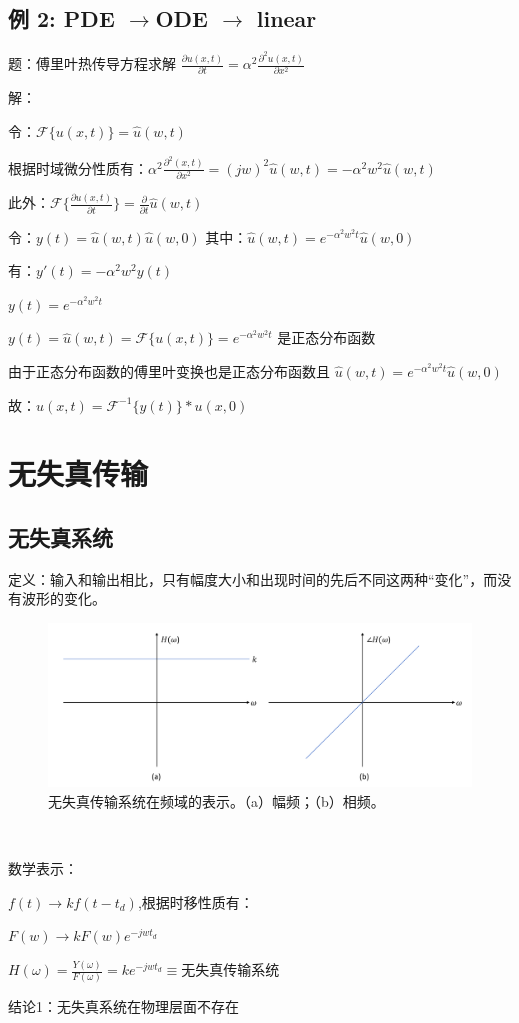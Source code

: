 \documentclass[UTF8]{ctexart}
\begin{document}
\subsection{例 2: PDE $\rightarrow $ODE $\rightarrow $ linear}
题：傅里叶热传导方程求解  $\frac{\partial u(x,t)}{\partial t}=\alpha ^2\frac{\partial^2 u(x,t)}{\partial x^2} $ \par
解：\par
\qquad 令：$\mathscr{F}\{u(x,t)\}=\hat{u}(w,t) $\par
\qquad 根据时域微分性质有：$\alpha ^2\frac{\partial^2 (x,t)}{\partial x^2}=(jw)^2 \hat{u}(w,t)= -\alpha ^2w^2\hat{u}(w,t)$\par
\qquad 此外：$\mathscr{F}\{\frac{\partial u(x,t)}{\partial t}\}=\frac{\partial }{\partial t}\hat{u}(w,t)$\par
\qquad 令：$y(t)=\hat{u}(w,t)\hat{u}(w,0) $ 其中：$\hat{u}(w,t)=e^{-\alpha ^2w^2t}\hat{u}(w,0) $\par
\qquad 有：$y'(t)=-\alpha ^2w^2y(t) $\par
\qquad \qquad  $y(t)=e^{-\alpha ^2w^2t}$\par
\qquad \qquad $y(t)=\hat{u}(w,t)=\mathscr{F}\{u(x,t)\}=e^{-\alpha ^2w^2t}$ 是正态分布函数\par
由于正态分布函数的傅里叶变换也是正态分布函数且 $\hat{u}(w,t)=e^{-\alpha ^2w^2t}\hat{u}(w,0) $\par
\qquad 故：$u(x,t)=\mathscr{F}^{-1}\{y(t)\}\ast u(x,0) $\par
\section{无失真传输}
\subsection{无失真系统}
定义：输入和输出相比，只有幅度大小和出现时间的先后不同这两种“变化”，而没有波形的变化。\par

\begin{figure}[h]
    \centering         %
    \includegraphics[scale=0.4]{1.png}
    \caption{无失真传输系统在频域的表示。（a）幅频；（b）相频。}
\end{figure} \par
\,\par
数学表示：\par
$f(t)\longrightarrow kf(t-t_d)$,根据时移性质有：\par
$F(w)\longrightarrow kF(w)e^{-jwt_d}$\par
$ H(\omega)=\frac{Y(\omega)}{F(\omega)} =ke^{-jwt_d} \equiv $无失真传输系统\par
结论1：无失真系统在物理层面不存在
\end{document}

